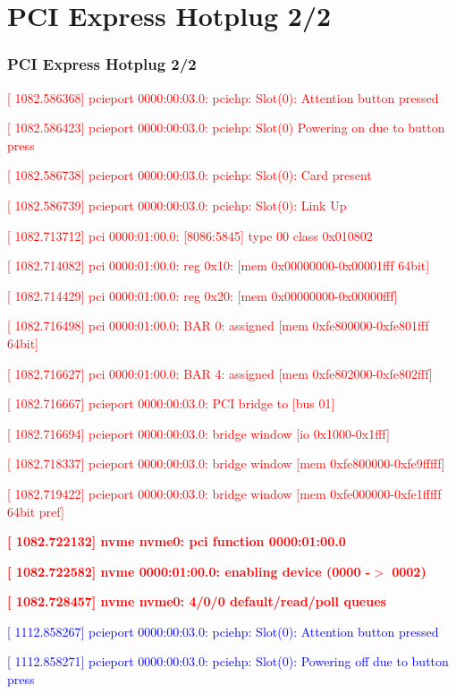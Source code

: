 \documentclass[aspectratio=169]{beamer}
\begin{document}
\section{PCI Express Hotplug 2/2}
\begin{frame}
\frametitle{PCI Express Hotplug 2/2}
\begin{block}{}
\scriptsize
\textcolor{red}{[ 1082.586368] pcieport 0000:00:03.0: pciehp: Slot(0): Attention button pressed}

\textcolor{red}{[ 1082.586423] pcieport 0000:00:03.0: pciehp: Slot(0) Powering on due to button press}

\textcolor{red}{[ 1082.586738] pcieport 0000:00:03.0: pciehp: Slot(0): Card present}

\textcolor{red}{[ 1082.586739] pcieport 0000:00:03.0: pciehp: Slot(0): Link Up}

\textcolor{red}{[ 1082.713712] pci 0000:01:00.0: [8086:5845] type 00 class 0x010802}

\textcolor{red}{[ 1082.714082] pci 0000:01:00.0: reg 0x10: [mem 0x00000000-0x00001fff 64bit]}

\textcolor{red}{[ 1082.714429] pci 0000:01:00.0: reg 0x20: [mem 0x00000000-0x00000fff]}

\textcolor{red}{[ 1082.716498] pci 0000:01:00.0: BAR 0: assigned [mem 0xfe800000-0xfe801fff 64bit]}

\textcolor{red}{[ 1082.716627] pci 0000:01:00.0: BAR 4: assigned [mem 0xfe802000-0xfe802fff]}

\textcolor{red}{[ 1082.716667] pcieport 0000:00:03.0: PCI bridge to [bus 01]}

\textcolor{red}{[ 1082.716694] pcieport 0000:00:03.0:   bridge window [io  0x1000-0x1fff]}

\textcolor{red}{[ 1082.718337] pcieport 0000:00:03.0:   bridge window [mem 0xfe800000-0xfe9fffff]}

\textcolor{red}{[ 1082.719422] pcieport 0000:00:03.0:   bridge window [mem 0xfe000000-0xfe1fffff 64bit pref]}

\textbf{\textcolor{red}{[ 1082.722132] nvme nvme0: pci function 0000:01:00.0}}

\textbf{\textcolor{red}{[ 1082.722582] nvme 0000:01:00.0: enabling device (0000 -$>$ 0002)}}

\textbf{\textcolor{red}{[ 1082.728457] nvme nvme0: 4/0/0 default/read/poll queues}} \newline

\textcolor{blue}{[ 1112.858267] pcieport 0000:00:03.0: pciehp: Slot(0): Attention button pressed}

\textcolor{blue}{[ 1112.858271] pcieport 0000:00:03.0: pciehp: Slot(0): Powering off due to button press}
\end{block}
\end{frame}
\end{document}
